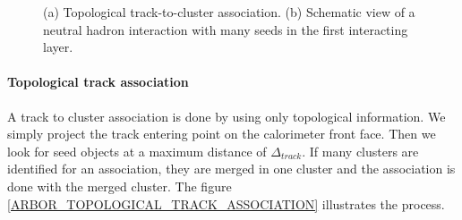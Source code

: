 \documentclass[cits]{JINST}
\begin{document}
\begin{center}
  \begin{figure}[!ht]
    \hfill 
    \caption{(a) Topological track-to-cluster association. (b) Schematic view of a neutral hadron interaction with many seeds in the first interacting layer.}
    \label{ARBOR_ASSOCIATION_ALGORITHMS}
  \end{figure}
\end{center}

\paragraph*{Topological track association} A track to cluster association is done by using only topological information. We simply project the track entering point on the calorimeter front face. Then we look for seed objects at a maximum distance of $\Delta_{track}$. If many clusters are identified for an association, they are merged in one cluster and the association is done with the merged cluster. The figure \ref{ARBOR_TOPOLOGICAL_TRACK_ASSOCIATION} illustrates the process.
\end{document}
